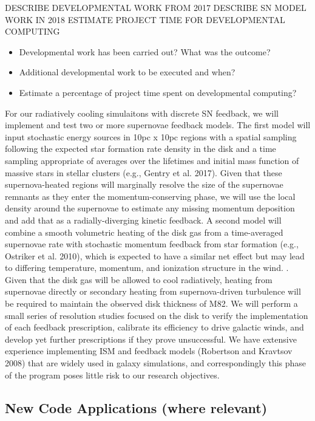 \documentclass[11pt,letterpaper,english]{article}
\begin{document}
DESCRIBE DEVELOPMENTAL WORK FROM 2017
DESCRIBE SN MODEL WORK IN 2018
ESTIMATE PROJECT TIME FOR DEVELOPMENTAL COMPUTING

\begin{itemize}
  \item Developmental work has been carried out?  What was the outcome?
  \item Additional developmental work to be executed and when?
  \item Estimate a percentage of project time spent on developmental computing?
\end{itemize}

For our radiatively cooling simulaitons with discrete SN feedback, we will implement and test two or more supernovae feedback models. The first model will input stochastic energy sources in 10pc x 10pc regions with a spatial sampling following the expected star formation rate density in the disk and a time sampling appropriate of averages over the lifetimes and initial mass function of massive stars in stellar clusters (e.g., Gentry et al. 2017). Given that these supernova-heated regions will marginally resolve the size of the supernovae remnants as they enter the momentum-conserving phase, we will use the local density around the supernovae to estimate any missing momentum deposition and add that as a radially-diverging kinetic feedback. A second model will combine a smooth volumetric heating of the disk gas from a time-averaged supernovae rate with stochastic momentum feedback from star formation (e.g., Ostriker et al. 2010), which is expected to have a similar net effect but may lead to differing temperature, momentum, and ionization structure in the wind. . 
Given that the disk gas will be allowed to cool radiatively, heating from supernovae directly or secondary heating from supernova-driven turbulence will be required to maintain the observed disk thickness of M82. We will perform a small series of resolution studies focused on the disk to verify the implementation of each feedback prescription, calibrate its efficiency to drive galactic winds, and develop yet further prescriptions if they prove unsuccessful. We have extensive experience implementing ISM and feedback models (Robertson and Kravtsov 2008) that are widely used in galaxy simulations, and correspondingly this phase of the program poses little risk to our research objectives.

\subsection{New Code Applications (where relevant)} 
\end{document}
